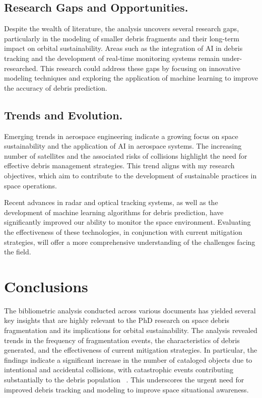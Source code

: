 \documentclass[journal ]{new-aiaa}
\begin{document}
\subsection{Research Gaps and Opportunities.}
Despite the wealth of literature, the analysis uncovers several research gaps, particularly in the modeling of smaller debris fragments and their long-term impact on orbital sustainability. Areas such as the integration of AI in debris tracking and the development of real-time monitoring systems remain under-researched. This research could address these gaps by focusing on innovative modeling techniques and exploring the application of machine learning to improve the accuracy of debris prediction.

\subsection{Trends and Evolution.}
Emerging trends in aerospace engineering indicate a growing focus on space sustainability and the application of AI in aerospace systems. The increasing number of satellites and the associated risks of collisions highlight the need for effective debris management strategies. This trend aligns with my research objectives, which aim to contribute to the development of sustainable practices in space operations.

Recent advances in radar and optical tracking systems, as well as the development of machine learning algorithms for debris prediction, have significantly improved our ability to monitor the space environment. Evaluating the effectiveness of these technologies, in conjunction with current mitigation strategies, will offer a more comprehensive understanding of the challenges facing the field.

\section{Conclusions}

The bibliometric analysis conducted across various documents has yielded several key insights that are highly relevant to the PhD research on space debris fragmentation and its implications for orbital sustainability. The analysis revealed trends in the frequency of fragmentation events, the characteristics of debris generated, and the effectiveness of current mitigation strategies. In particular, the findings indicate a significant increase in the number of cataloged objects due to intentional and accidental collisions, with catastrophic events contributing substantially to the debris population ~\cite{pardini_review_2014}. This underscores the urgent need for improved debris tracking and modeling to improve space situational awareness.
\end{document}
